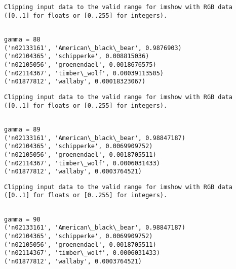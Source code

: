 \documentclass[11pt]{article}
\begin{document}
    \begin{Verbatim}[commandchars=\\\{\}]
Clipping input data to the valid range for imshow with RGB data ([0..1] for floats or [0..255] for integers).

    \end{Verbatim}

    \begin{Verbatim}[commandchars=\\\{\}]

gamma = 88
('n02133161', 'American\_black\_bear', 0.9876903)
('n02104365', 'schipperke', 0.008815036)
('n02105056', 'groenendael', 0.0018676575)
('n02114367', 'timber\_wolf', 0.00039113505)
('n01877812', 'wallaby', 0.00018323067)

    \end{Verbatim}

    \begin{Verbatim}[commandchars=\\\{\}]
Clipping input data to the valid range for imshow with RGB data ([0..1] for floats or [0..255] for integers).

    \end{Verbatim}

    \begin{Verbatim}[commandchars=\\\{\}]

gamma = 89
('n02133161', 'American\_black\_bear', 0.98847187)
('n02104365', 'schipperke', 0.0069909752)
('n02105056', 'groenendael', 0.0018705511)
('n02114367', 'timber\_wolf', 0.0006031433)
('n01877812', 'wallaby', 0.0003764521)

    \end{Verbatim}

    \begin{Verbatim}[commandchars=\\\{\}]
Clipping input data to the valid range for imshow with RGB data ([0..1] for floats or [0..255] for integers).

    \end{Verbatim}

    \begin{Verbatim}[commandchars=\\\{\}]

gamma = 90
('n02133161', 'American\_black\_bear', 0.98847187)
('n02104365', 'schipperke', 0.0069909752)
('n02105056', 'groenendael', 0.0018705511)
('n02114367', 'timber\_wolf', 0.0006031433)
('n01877812', 'wallaby', 0.0003764521)

    \end{Verbatim}
\end{document}
